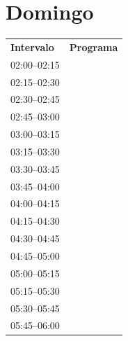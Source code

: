 \documentclass[11pt,a4paper]{article}
\begin{document}
\section*{Domingo}
\begin{center}
\begin{adjustbox}{max totalsize={\textwidth}{0.82\textheight},center}
\begin{tabular}{|p{3.6cm}|p{11cm}|}
\hline
\textbf{Intervalo} & \textbf{Programa} \\
\cline{1-1}
{\centering\rule{0pt}{2.80ex}02:00--02:15} & {\centering\rule{0pt}{2.80ex}} \\
\cline{1-1}
{\centering\rule{0pt}{2.80ex}02:15--02:30} & {\centering\rule{0pt}{2.80ex}} \\
\cline{1-1}
{\centering\rule{0pt}{2.80ex}02:30--02:45} & {\centering\rule{0pt}{2.80ex}} \\
\cline{1-1}
{\centering\rule{0pt}{2.80ex}02:45--03:00} & {\centering\rule{0pt}{2.80ex}} \\
\cline{1-1}
{\centering\rule{0pt}{2.80ex}03:00--03:15} & {\centering\rule{0pt}{2.80ex}} \\
\cline{1-1}
{\centering\rule{0pt}{2.80ex}03:15--03:30} & {\centering\rule{0pt}{2.80ex}} \\
\cline{1-1}
{\centering\rule{0pt}{2.80ex}03:30--03:45} & {\centering\rule{0pt}{2.80ex}} \\
\cline{1-1}
{\centering\rule{0pt}{2.80ex}03:45--04:00} & {\centering\rule{0pt}{2.80ex}} \\
\cline{1-1}
{\centering\rule{0pt}{2.80ex}04:00--04:15} & {\centering\rule{0pt}{2.80ex}} \\
\cline{1-1}
{\centering\rule{0pt}{2.80ex}04:15--04:30} & {\centering\rule{0pt}{2.80ex}} \\
\cline{1-1}
{\centering\rule{0pt}{2.80ex}04:30--04:45} & {\centering\rule{0pt}{2.80ex}} \\
\cline{1-1}
{\centering\rule{0pt}{2.80ex}04:45--05:00} & {\centering\rule{0pt}{2.80ex}} \\
\cline{1-1}
{\centering\rule{0pt}{2.80ex}05:00--05:15} & {\centering\rule{0pt}{2.80ex}} \\
\cline{1-1}
{\centering\rule{0pt}{2.80ex}05:15--05:30} & {\centering\rule{0pt}{2.80ex}} \\
\cline{1-1}
{\centering\rule{0pt}{2.80ex}05:30--05:45} & {\centering\rule{0pt}{2.80ex}} \\
\cline{1-1}
{\centering\rule{0pt}{2.80ex}05:45--06:00} & {\centering\rule{0pt}{2.80ex}} \\

\end{tabular}
\end{adjustbox}
\end{center}
\end{document}
